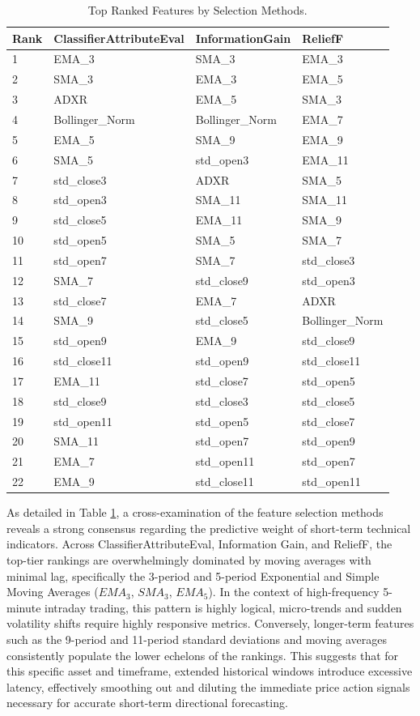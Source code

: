 \documentclass{ieeeaccess}
\begin{document}
\begin{table}
\caption{Top Ranked Features by Selection Methods.}
\label{tab:feature_ranking}
\setlength{\tabcolsep}{3pt}
\begin{tabular}{|p{25pt}|p{65pt}|p{65pt}|p{65pt}|}
\hline
Rank & ClassifierAttributeEval & InformationGain & ReliefF    \\
\hline
1 & EMA\_3 & SMA\_3 & EMA\_3 \\
2 & SMA\_3 & EMA\_3 & EMA\_5 \\
3 & ADXR & EMA\_5 & SMA\_3 \\
4 & Bollinger\_Norm & Bollinger\_Norm & EMA\_7 \\
5 & EMA\_5 & SMA\_9 & EMA\_9 \\
6 & SMA\_5 & std\_open3 & EMA\_11 \\
7 & std\_close3 & ADXR & SMA\_5 \\
8 & std\_open3 & SMA\_11 & SMA\_11 \\
9 & std\_close5 & EMA\_11 & SMA\_9 \\
10 & std\_open5 & SMA\_5 & SMA\_7 \\
11 & std\_open7 & SMA\_7 & std\_close3 \\
12 & SMA\_7 & std\_close9 & std\_open3 \\
13 & std\_close7 & EMA\_7 & ADXR \\
14 & SMA\_9 & std\_close5 & Bollinger\_Norm \\
15 & std\_open9 & EMA\_9 & std\_close9 \\
16 & std\_close11 & std\_open9 & std\_close11 \\
17 & EMA\_11 & std\_close7 & std\_open5 \\
18 & std\_close9 & std\_close3 & std\_close5 \\
19 & std\_open11 & std\_open5 & std\_close7 \\
20 & SMA\_11 & std\_open7 & std\_open9 \\
21 & EMA\_7 & std\_open11 & std\_open7 \\
22 & EMA\_9 & std\_close11 & std\_open11 \\
\hline
\end{tabular}
\end{table}

As detailed in Table \ref{tab:feature_ranking}, a cross-examination of the feature selection methods reveals a strong consensus regarding the predictive weight of short-term technical indicators. Across ClassifierAttributeEval, Information Gain, and ReliefF, the top-tier rankings are overwhelmingly dominated by moving averages with minimal lag, specifically the 3-period and 5-period Exponential and Simple Moving Averages ($EMA_3$, $SMA_3$, $EMA_5$). In the context of high-frequency 5-minute intraday trading, this pattern is highly logical, micro-trends and sudden volatility shifts require highly responsive metrics. Conversely, longer-term features such as the 9-period and 11-period standard deviations and moving averages consistently populate the lower echelons of the rankings. This suggests that for this specific asset and timeframe, extended historical windows introduce excessive latency, effectively smoothing out and diluting the immediate price action signals necessary for accurate short-term directional forecasting.
\end{document}
